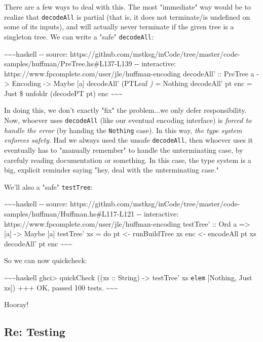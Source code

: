 \documentclass[]{article}
\begin{document}
There are a few ways to deal with this. The most "immediate" way would be to
realize that \texttt{decodeAll} is partial (that is, it does not terminate/is
undefined on some of its inputs), and will actually never terminate if the given
tree is a singleton tree. We can write a "safe" \texttt{decodeAll}:

\textasciitilde{}\textasciitilde{}\textasciitilde{}haskell -\/- source:
https://github.com/mstksg/inCode/tree/master/code-samples/huffman/PreTree.hs\#L137-L139
-\/- interactive: https://www.fpcomplete.com/user/jle/huffman-encoding
decodeAll' :: PreTree a -\textgreater{} Encoding -\textgreater{} Maybe {[}a{]}
decodeAll' (PTLeaf \emph{) } = Nothing decodeAll' pt enc = Just \$ unfoldr
(decodePT pt) enc \textasciitilde{}\textasciitilde{}\textasciitilde{}

In doing this, we don't exactly "fix" the problem...we only defer
responsibility. Now, whoever uses \texttt{decodeAll\textquotesingle{}} (like our
eventual encoding interface) is \emph{forced to handle the error} (by handing
the \texttt{Nothing} case). In this way, \emph{the type system enforces safety}.
Had we always used the unsafe \texttt{decodeAll}, then whoever uses it
eventually has to "manually remember" to handle the unterminating case, by
carefuly reading documentation or something. In this case, the type system is a
big, explicit reminder saying "hey, deal with the unterminating case."

We'll also a "safe" \texttt{testTree}:

\textasciitilde{}\textasciitilde{}\textasciitilde{}haskell -\/- source:
https://github.com/mstksg/inCode/tree/master/code-samples/huffman/Huffman.hs\#L117-L121
-\/- interactive: https://www.fpcomplete.com/user/jle/huffman-encoding testTree'
:: Ord a =\textgreater{} {[}a{]} -\textgreater{} Maybe {[}a{]} testTree' xs = do
pt \textless{}- runBuildTree xs enc \textless{}- encodeAll pt xs decodeAll' pt
enc \textasciitilde{}\textasciitilde{}\textasciitilde{}

So we can now quickcheck:

\textasciitilde{}\textasciitilde{}\textasciitilde{}haskell ghci\textgreater{}
quickCheck ((xs :: String) -\textgreater{} testTree' xs \texttt{elem}
{[}Nothing, Just xs{]}) +++ OK, passed 100 tests.
\textasciitilde{}\textasciitilde{}\textasciitilde{}

Hooray!

\subsection{Re: Testing}
\end{document}
